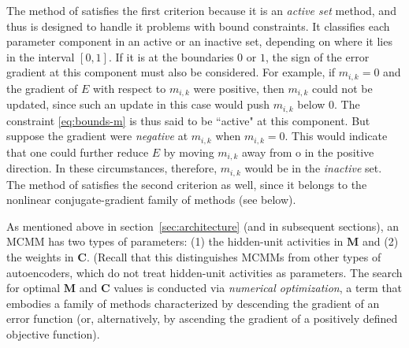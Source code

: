 The method of \citet{cheng-and-li:2012} satisfies the first criterion 
because it is an \emph{active set} method, and thus is designed to handle 
it problems with bound constraints. It classifies each parameter component 
in an active or an inactive set, depending on where it lies in the interval $[0,1]$. 
If it is at the boundaries $0$ or $1$, the sign of the error gradient at this component 
must also be considered. For example, if $m_{i,k} = 0$ and the gradient of $E$ 
with respect to $m_{i,k}$ were positive, then $m_{i,k}$ could not be updated, 
since such an update in this case would push $m_{i,k}$ below $0$.  
The constraint \eqref{eq:bounds-m} is thus said to be ``active" at this component. 
But suppose the gradient were \emph{negative} at $m_{i,k}$ when $m_{i,k} = 0$. 
This would indicate that one could further reduce $E$ by moving $m_{i,k}$ away 
from o in the positive direction. In these circumstances, therefore, $m_{i,k}$ 
would be in the \emph{inactive} set.
The method of \citet{cheng-and-li:2012} satisfies the second criterion as well, 
since it belongs to the nonlinear conjugate-gradient family of methods (see below).

 
As mentioned above in section~\ref{sec:architecture} (and in subsequent sections), 
an MCMM has two types of parameters:
(1) the hidden-unit activities in $\textbf{M}$ and (2) the weights in $\textbf{C}$. (Recall that this 
distinguishes MCMMs from other types of autoencoders, which do not treat hidden-unit activities as parameters.  
The search for optimal $\textbf{M}$ and $\textbf{C}$ values is conducted
via %
\emph{numerical optimization}, a term that embodies a family of methods characterized by descending the gradient of an error function (or, alternatively, by ascending the gradient of a positively defined objective function). 


